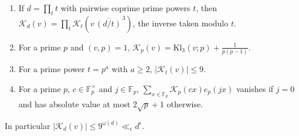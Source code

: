 \documentclass[11pt,colorlinks]{charlie}
\newcommand{\F}{\mathbb{F}}
\begin{document}
\begin{lemma}\label{lem:Kd}
\begin{enumerate}[label=\textup{(\roman*)}]
\item If $d=\prod_tt$ with pairwise coprime prime powers $t$, then $\mathscr K_d(v)=\prod_t\mathscr K_t(v\,\overline{(d/t)}^{\,3})$, the inverse taken modulo $t$.
\item For a prime $p$ and $(v,p)=1$, $\mathscr K_p(v)=\mathrm{Kl}_3(v;p)+\frac1{p(p-1)}$.
\item For a prime power $t=p^a$ with $a\ge2$, $|\mathscr K_t(v)|\le9$.
\item For a prime $p$, $c\in\F_p^\times$ and $j\in\F_p$, $\sum_{x\in\F_p}\mathscr K_p(cx)e_p(jx)$ vanishes if $j=0$ and has absolute value at most $2\sqrt p+1$ otherwise.
\end{enumerate}
In particular $|\mathscr K_d(v)|\le9^{\omega(d)}\ll_\epsilon d^\epsilon$.
\end{lemma}
\end{document}
